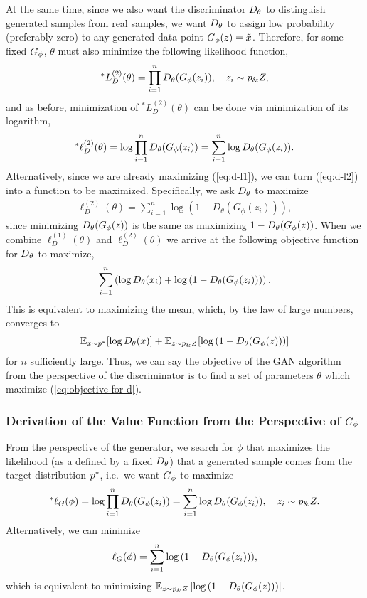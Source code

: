 At the same time, since we also want the discriminator $D_\theta$ to
distinguish generated samples from real samples, we want $D_\theta$ to
assign low probability (preferably zero) to any generated data point
$G_\phi(z) = \tilde{x}$.  Therefore, for some fixed $G_\phi$, $\theta$
must also minimize the following likelihood function,
\begin{align}
  ^*L_{D}^{(2)}(\theta) = \prod_{i=1}^n D_\theta(G_\phi(z_i)), \quad z_i \sim p_\&Z,
\end{align}
and as before, minimization of $^*L_{D}^{(2)}(\theta)$ can be done via
minimization of its logarithm,
\begin{align}
  \label{eq:d-l2} ^*\ell_{D}^{(2)}(\theta) = \log \prod_{i=1}^n D_\theta(G_\phi(z_i)) = \sum_{i=1}^n \log D_\theta (G_\phi(z_i)).
\end{align}
Alternatively, since we are already maximizing (\ref{eq:d-l1}), we can
turn (\ref{eq:d-l2}) into a function to be maximized. Specifically, we
ask $D_\theta$ to maximize
\begin{align}
  \ell_{D}^{(2)}(\theta) = \sum_{i=1}^n \log{(1 - D_\theta(G_\phi(z_i)))},
\end{align}
since minimizing $D_\theta(G_\phi(z))$ is the same as maximizing
$1 - D_\theta(G_\phi(z))$. When we combine $\ell_{D}^{(1)}(\theta)$ and
$\ell_{D}^{(2)}(\theta)$ we arrive at the following objective function
for $D_\theta$ to maximize,
\begin{align}
  \sum_{i=1}^n \left( \log D_\theta(x_i) + \log{(1 - D_\theta(G_\phi(z_i)))} \right).
\end{align}
This is equivalent to maximizing the mean, which, by the law of large
numbers, converges to
\begin{align}
  \label{eq:objective-for-d}
  \mathbb{E}_{x \sim p^*}[{\log D_\theta(x})] + \mathbb{E}_{z \sim p_\&Z}[\log{(1 - D_\theta(G_\phi(z)))}]
\end{align}
for $n$ sufficiently large. Thus, we can say the objective of the GAN
algorithm from the perspective of the discriminator is to find a set
of parameters $\theta$ which maximize (\ref{eq:objective-for-d}).

\subsubsection{Derivation of the Value Function from the Perspective of $G_\phi$}
\label{sec:derivation-g}

From the perspective of the generator, we search for $\phi$ that
maximizes the likelihood (as a defined by a fixed $D_\theta$) that a
generated sample comes from the target distribution $p^*$, i.e.\ we
want $G_\phi$ to maximize
\begin{align}
  ^*\ell_G(\phi) = \log\prod_{i=1}^nD_\theta(G_\phi(z_i)) = \sum_{i=1}^n\log{D_\theta(G_\phi(z_i))}, \quad z_i \sim p_\&Z.
\end{align}
Alternatively, we can minimize
\begin{align}
  \ell_G(\phi) = \sum_{i=1}^n\log{(1 - D_\theta(G_\phi(z_i)))},
\end{align}
which is equivalent to minimizing $\mathbb{E}_{z \sim p_\&Z} \left[\log{(1 - D_\theta(G_\phi(z)))} \right]$.

